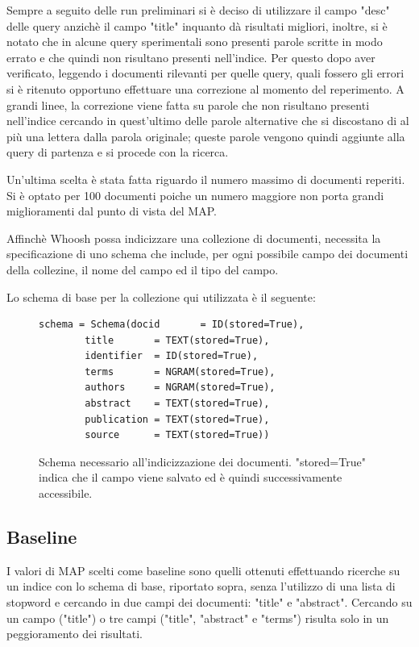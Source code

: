\documentclass[runningheads]{llncs}
\begin{document}
Sempre a seguito delle run preliminari si \`e deciso di utilizzare il campo "desc" delle query anzich\`e il campo "title" inquanto d\`a risultati migliori, inoltre, si \`e notato che in alcune query sperimentali sono presenti parole scritte in modo errato e che quindi non risultano presenti nell'indice.
Per questo dopo aver verificato, leggendo i documenti rilevanti per quelle query, quali fossero gli errori si \`e ritenuto opportuno effettuare una correzione al momento del reperimento.
A grandi linee, la correzione viene fatta su parole che non risultano presenti nell'indice cercando in quest'ultimo delle parole alternative che si discostano di al pi\`u una lettera dalla parola originale; queste parole vengono quindi aggiunte alla query di partenza e si procede con la ricerca.

Un'ultima scelta \`e stata fatta riguardo il numero massimo di documenti reperiti.
Si \`e optato per 100 documenti poiche un numero maggiore non porta grandi miglioramenti dal punto di vista del MAP. \par

\vskip 1in
Affinch\`e Whoosh possa indicizzare una collezione di documenti, necessita la
specificazione di uno schema che include, per ogni possibile campo dei documenti della collezine, il nome del campo ed il tipo del campo.

Lo schema di base per la collezione qui utilizzata \`e il seguente:
\par

\begin{figure}
\begin{lstlisting}
schema = Schema(docid      	= ID(stored=True),
		title      	= TEXT(stored=True),
		identifier	= ID(stored=True),
		terms 		= NGRAM(stored=True),
		authors		= NGRAM(stored=True),
		abstract 	= TEXT(stored=True),
		publication	= TEXT(stored=True),
		source 		= TEXT(stored=True))
\end{lstlisting}
      \caption{Schema necessario all'indicizzazione dei documenti. "stored=True" indica che il campo viene salvato ed \`e quindi successivamente accessibile. }
\end{figure}




\subsection{Baseline}
I valori di MAP scelti come baseline sono quelli ottenuti effettuando ricerche su un indice con lo schema di base, riportato sopra, senza l'utilizzo di una lista di stopword e cercando in due campi dei documenti: "title" e "abstract".
Cercando su un campo ("title") o tre campi ("title", "abstract" e "terms") risulta solo in un peggioramento dei risultati.
\end{document}

